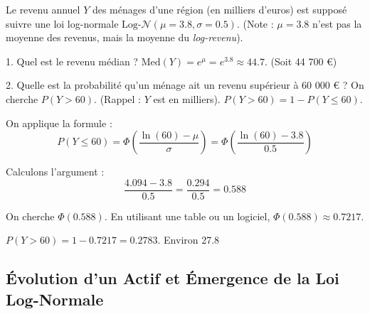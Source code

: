 \begin{examplebox}
Le revenu annuel $Y$ des ménages d'une région (en milliers d'euros) est supposé suivre une loi log-normale $\text{Log-}\mathcal{N}(\mu=3.8, \sigma=0.5)$.
(Note : $\mu=3.8$ n'est pas la moyenne des revenus, mais la moyenne du \textit{log-revenu}).

1. Quel est le revenu médian ?
   $\text{Med}(Y) = e^{\mu} = e^{3.8} \approx 44.7$. (Soit 44 700 €)

2. Quelle est la probabilité qu'un ménage ait un revenu supérieur à 60 000 € ?
   On cherche $P(Y > 60)$. (Rappel : $Y$ est en milliers).
   $P(Y > 60) = 1 - P(Y \le 60)$.

   On applique la formule :
   $$ P(Y \le 60) = \Phi\left( \frac{\ln(60) - \mu}{\sigma} \right) = \Phi\left( \frac{\ln(60) - 3.8}{0.5} \right) $$

   Calculons l'argument :
   $$ \frac{4.094 - 3.8}{0.5} = \frac{0.294}{0.5} = 0.588 $$

   On cherche $\Phi(0.588)$. En utilisant une table ou un logiciel, $\Phi(0.588) \approx 0.7217$.
   
   $P(Y > 60) = 1 - 0.7217 = 0.2783$.
   Environ 27.8%
\end{examplebox}


\subsection{Évolution d’un Actif et Émergence de la Loi Log-Normale}

